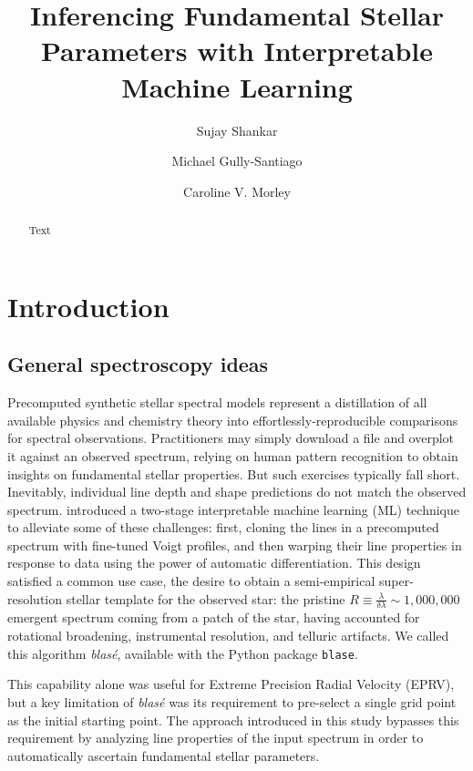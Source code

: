 \documentclass[twocolumn]{aastex631}
\begin{document}
\title{Inferencing Fundamental Stellar Parameters with Interpretable Machine Learning}
    
\author[0000-0002-2290-6810]{Sujay Shankar}
\author[0000-0002-4020-3457]{Michael Gully-Santiago}
\author[0000-0002-4404-0456]{Caroline V. Morley}

\begin{abstract}
    Text
\end{abstract}



\section{Introduction}
\subsection{General spectroscopy ideas}

Precomputed synthetic stellar spectral models represent a distillation of all available physics
and chemistry theory into effortlessly-reproducible comparisons for spectral observations.
Practitioners may simply download a file and overplot it against an observed spectrum, relying on
human pattern recognition to obtain insights on fundamental stellar properties. But such exercises
typically fall short. Inevitably, individual line depth and shape predictions do not match the
observed spectrum. \citet{2022ApJ...941..200G} introduced a two-stage interpretable machine learning (ML)
technique to alleviate some of these challenges: first, cloning the lines in a precomputed spectrum
with fine-tuned Voigt profiles, and then warping their line properties in response to data using
the power of automatic differentiation. This design satisfied a common use case, the desire to
obtain a semi-empirical super-resolution stellar template for the observed star: the pristine
$R\equiv\frac{\lambda}{\delta \lambda}\sim1,000,000$ emergent spectrum coming from a patch of the star,
having accounted for rotational broadening, instrumental resolution, and telluric artifacts.
We called this algorithm \emph{blas\'e}, available with the Python package \texttt{blase}.

This capability alone was useful for Extreme Precision Radial Velocity (EPRV), but a key limitation
of \emph{blas\'e} was its requirement to pre-select a single grid point as the initial starting point. The approach
introduced in this study bypasses this requirement by analyzing line properties of the input spectrum
in order to automatically ascertain fundamental stellar parameters.
\end{document}
